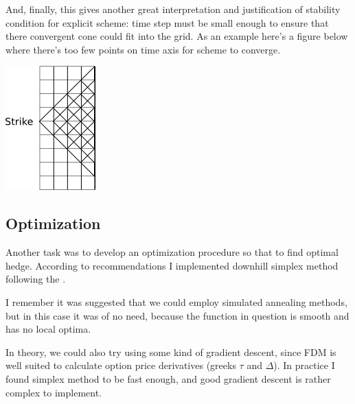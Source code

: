 \documentclass[11pt]{article} %
\begin{document}
And, finally, this gives another great interpretation and justification of stability condition for explicit scheme: time step must be small enough to ensure that there convergent cone could fit into the grid. As an example here's a figure below where there's too few points on time axis for scheme to converge.

\includegraphics[scale=0.5]{non-convergent-tree.png}\\

\subsection{Optimization}

Another task was to develop an optimization procedure so that to find optimal hedge. According to recommendations I implemented downhill simplex method following the \cite[\S 10.5]{JacksonStaunton02}. 

I remember it was suggested that we could employ simulated annealing methods, but in this case it was of no need, because the function in question is smooth and has no local optima.

In theory, we could also try using some kind of gradient descent, since FDM is well suited to calculate option price derivatives (greeks $\tau$ and $\Delta$). In practice I found simplex method to be fast enough, and good gradient descent is rather complex to implement.
\end{document}
